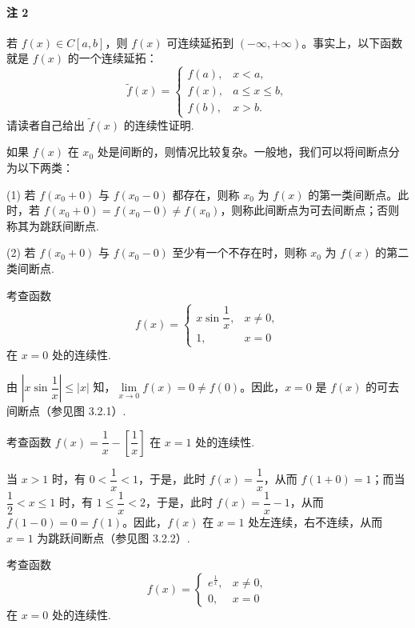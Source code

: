 \paragraph*{注 2}
若 $f(x)\in C[a,b]$，则 $f(x)$ 可连续延拓到 $(-\infty,+\infty)$。事实上，以下函数就是 $f(x)$ 的一个连续延拓：
\[
  \tilde f(x)=
  \begin{cases}
    f(a), & x<a,\\
    f(x), & a\leqslant x\leqslant b,\\
    f(b), & x>b.
  \end{cases}
\]
请读者自己给出 $\tilde f(x)$ 的连续性证明.

如果 $f(x)$ 在 $x_0$ 处是间断的，则情况比较复杂。一般地，我们可以将间断点分为以下两类：

(1) 若 $f(x_0+0)$ 与 $f(x_0-0)$ 都存在，则称 $x_0$ 为 $f(x)$ 的第一类间断点。此时，若 $f(x_0+0)=f(x_0-0)\ne f(x_0)$，则称此间断点为可去间断点；否则称其为跳跃间断点.

(2) 若 $f(x_0+0)$ 与 $f(x_0-0)$ 至少有一个不存在时，则称 $x_0$ 为 $f(x)$ 的第二类间断点.

\begin{example}\label{example:ma-3-2-3}
考查函数
\[
  f(x)=
  \begin{cases}
    x\sin\dfrac1x, & x\ne0,\\
    1, & x=0
  \end{cases}
\]
在 $x=0$ 处的连续性.
\end{example}


\begin{solve}
由 $\left|x\sin\dfrac1x\right|\leqslant |x|$ 知，$\lim\limits_{x\to0}f(x)=0\ne f(0)$。因此，$x=0$ 是 $f(x)$ 的可去间断点（参见图 3.2.1）.
\end{solve}


\begin{example}\label{example:ma-3-2-4}
考查函数 $f(x)=\dfrac1x-\left[\dfrac1x\right]$ 在 $x=1$ 处的连续性.
\end{example}


\begin{solve}
当 $x>1$ 时，有 $0<\dfrac1x<1$，于是，此时 $f(x)=\dfrac1x$，从而 $f(1+0)=1$；而当 $\dfrac12<x\leqslant1$ 时，有 $1\leqslant\dfrac1x<2$，于是，此时 $f(x)=\dfrac1x-1$，从而 $f(1-0)=0=f(1)$。因此，$f(x)$ 在 $x=1$ 处左连续，右不连续，从而 $x=1$ 为跳跃间断点（参见图 3.2.2）.
\end{solve}


\begin{example}\label{example:ma-3-2-5}
考查函数
\[
  f(x)=
  \begin{cases}
    e^{\frac1x}, & x\ne0,\\
    0, & x=0
  \end{cases}
\]
在 $x=0$ 处的连续性.
\end{example}


